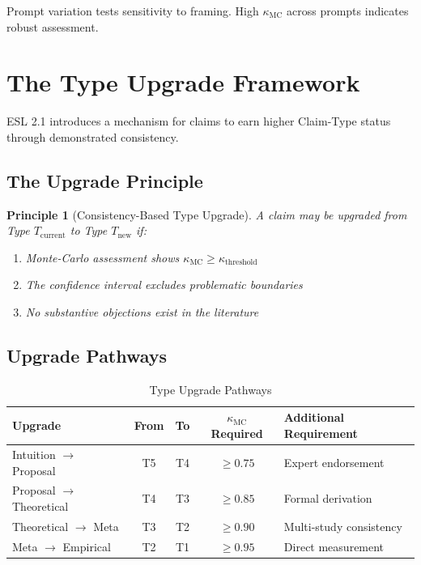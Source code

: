 \documentclass[11pt,a4paper]{article}
\newtheorem{principle}{Principle}[section]
\theoremstyle{remark}
\begin{document}
Prompt variation tests sensitivity to framing. High $\kappa_{\text{MC}}$ across prompts indicates robust assessment.


\section{The Type Upgrade Framework}
\label{sec:upgrade}

ESL 2.1 introduces a mechanism for claims to earn higher Claim-Type status through demonstrated consistency.

\subsection{The Upgrade Principle}

\begin{principle}[Consistency-Based Type Upgrade]
\label{princ:upgrade}
A claim may be upgraded from Type $T_{\text{current}}$ to Type $T_{\text{new}}$ if:
\begin{enumerate}
    \item Monte-Carlo assessment shows $\kappa_{\text{MC}} \geq \kappa_{\text{threshold}}$
    \item The confidence interval excludes problematic boundaries
    \item No substantive objections exist in the literature
\end{enumerate}
\end{principle}

\subsection{Upgrade Pathways}

\begin{table}[h]
\centering
\caption{Type Upgrade Pathways}
\label{tab:upgrade-pathways}
\begin{tabular}{lcccp{4cm}}
\toprule
\textbf{Upgrade} & \textbf{From} & \textbf{To} & \textbf{$\kappa_{\text{MC}}$ Required} & \textbf{Additional Requirement} \\
\midrule
Intuition $\to$ Proposal & T5 & T4 & $\geq 0.75$ & Expert endorsement \\
Proposal $\to$ Theoretical & T4 & T3 & $\geq 0.85$ & Formal derivation \\
Theoretical $\to$ Meta & T3 & T2 & $\geq 0.90$ & Multi-study consistency \\
Meta $\to$ Empirical & T2 & T1 & $\geq 0.95$ & Direct measurement \\
\bottomrule
\end{tabular}
\end{table}
\end{document}
